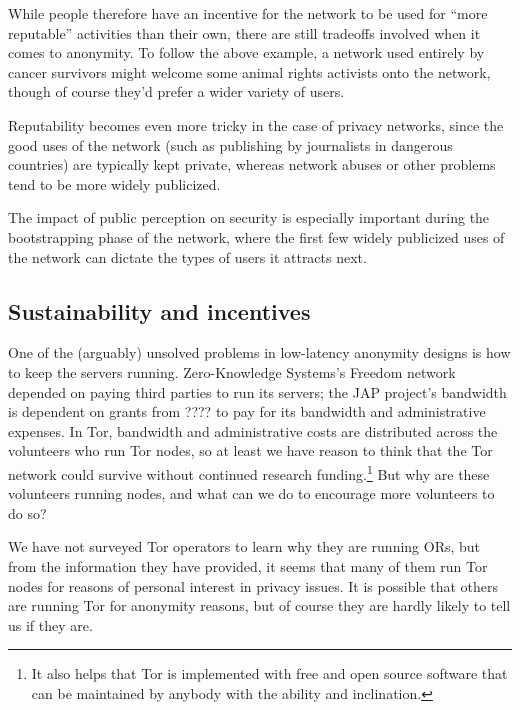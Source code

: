 \documentclass{llncs}
\begin{document}
While people therefore have an incentive for the network to be used for
``more reputable'' activities than their own, there are still tradeoffs
involved when it comes to anonymity. To follow the above example, a
network used entirely by cancer survivors might welcome some animal rights
activists onto the network, though of course they'd prefer a wider
variety of users.

Reputability becomes even more tricky in the case of privacy networks,
since the good uses of the network (such as publishing by journalists in
dangerous countries) are typically kept private, whereas network abuses
or other problems tend to be more widely publicized.

The impact of public perception on security is especially important
during the bootstrapping phase of the network, where the first few
widely publicized uses of the network can dictate the types of users it
attracts next.


\subsection{Sustainability and incentives}
One of the (arguably) unsolved problems in low-latency anonymity designs is
how to keep the servers running.  Zero-Knowledge Systems's Freedom network
depended on paying third parties to run its servers; the JAP project's
bandwidth is dependent on grants from ???? to pay for its bandwidth and
administrative expenses.  In Tor, bandwidth and administrative costs are
distributed across the volunteers who run Tor nodes, so at least we have
reason to think that the Tor network could survive without continued research
funding.\footnote{It also helps that Tor is implemented with free and open
  source software that can be maintained by anybody with the ability and
  inclination.}  But why are these volunteers running nodes, and what can we
do to encourage more volunteers to do so?

We have not surveyed Tor operators to learn why they are running ORs, but
from the information they have provided, it seems that many of them run Tor
nodes for reasons of personal interest in privacy issues.  It is possible
that others are running Tor for anonymity reasons, but of course they are
hardly likely to tell us if they are.
\end{document}
